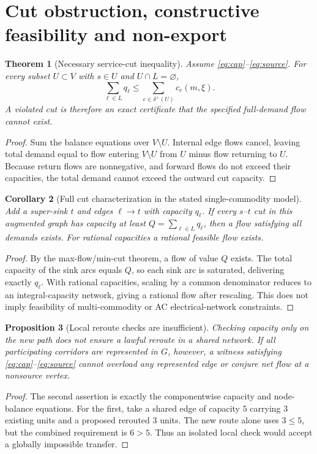 \documentclass[11pt,letterpaper]{article}
\newtheorem{theorem}{Theorem}[section]
\newtheorem{proposition}[theorem]{Proposition}
\newtheorem{corollary}[theorem]{Corollary}
\theoremstyle{definition}\newtheorem{definition}[theorem]{Definition}\newtheorem{example}[theorem]{Example}
\theoremstyle{remark}\newtheorem{remark}[theorem]{Remark}
\begin{document}
\section{Cut obstruction, constructive feasibility and non-export}
\begin{theorem}[Necessary service-cut inequality]\label{th:cut}
Assume \eqref{eq:cap}--\eqref{eq:source}. For every subset $U\subset V$ with $s\in U$ and $U\cap L=\varnothing$,
\begin{equation}\label{eq:cut}
\sum_{\ell\in L}q_\ell\le\sum_{e\in\delta^+(U)}c_e(m,\xi).
\end{equation}
A violated cut is therefore an exact certificate that the specified full-demand flow cannot exist.
\end{theorem}
\begin{proof}
Sum the balance equations over $V\setminus U$. Internal edge flows cancel, leaving total demand equal to flow entering $V\setminus U$ from $U$ minus flow returning to $U$. Because return flows are nonnegative, and forward flows do not exceed their capacities, the total demand cannot exceed the outward cut capacity.
\end{proof}
\begin{corollary}[Full cut characterization in the stated single-commodity model]\label{cor:maxflow}
Add a super-sink $t$ and edges $\ell\to t$ with capacity $q_\ell$. If every $s$--$t$ cut in this augmented graph has capacity at least $Q=\sum_{\ell\in L}q_\ell$, then a flow satisfying all demands exists. For rational capacities a rational feasible flow exists.
\end{corollary}
\begin{proof}
By the max-flow/min-cut theorem, a flow of value $Q$ exists. The total capacity of the sink arcs equals $Q$, so each sink arc is saturated, delivering exactly $q_\ell$. With rational capacities, scaling by a common denominator reduces to an integral-capacity network, giving a rational flow after rescaling. This does not imply feasibility of multi-commodity or AC electrical-network constraints.
\end{proof}
\begin{proposition}[Local reroute checks are insufficient]\label{prop:export}
Checking capacity only on the \emph{new} path does not ensure a lawful reroute in a shared network. If all participating corridors are represented in $G$, however, a witness satisfying \eqref{eq:cap}--\eqref{eq:source} cannot overload any \emph{represented} edge or conjure net flow at a nonsource vertex.
\end{proposition}
\begin{proof}
The second assertion is exactly the componentwise capacity and node-balance equations. For the first, take a shared edge of capacity $5$ carrying $3$ existing units and a proposed rerouted $3$ units. The new route alone uses $3\le5$, but the combined requirement is $6>5$. Thus an isolated local check would accept a globally impossible transfer.
\end{proof}
\end{document}
